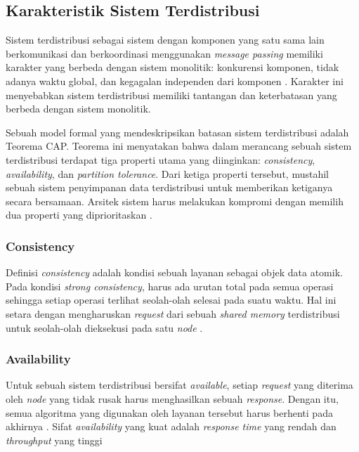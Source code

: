 \subsection{Karakteristik Sistem Terdistribusi}
\label{subsection:karakteristik-sistem-terdistribusi}

Sistem terdistribusi sebagai sistem dengan komponen yang satu sama lain berkomunikasi dan berkoordinasi menggunakan \textit{message passing} memiliki karakter yang berbeda dengan sistem monolitik: konkurensi komponen, tidak adanya waktu global, dan kegagalan independen dari komponen \parencite{coulouris2012distributed}. Karakter ini menyebabkan sistem terdistribusi memiliki tantangan dan keterbatasan yang berbeda dengan sistem monolitik.

Sebuah model formal yang mendeskripsikan batasan sistem terdistribusi adalah Teorema CAP. Teorema ini menyatakan bahwa dalam merancang sebuah sistem terdistribusi terdapat tiga properti utama yang diinginkan: \textit{consistency}, \textit{availability}, dan \textit{partition tolerance}. Dari ketiga properti tersebut, mustahil sebuah sistem penyimpanan data terdistribusi untuk memberikan ketiganya secara bersamaan. Arsitek sistem harus melakukan kompromi dengan memilih dua properti yang diprioritaskan \parencite{gilbert2002brewer}.

\subsubsection{Consistency}

Definisi \textit{consistency} adalah kondisi sebuah layanan sebagai objek data atomik. Pada kondisi \textit{strong consistency}, harus ada urutan total pada semua operasi sehingga setiap operasi terlihat seolah-olah selesai pada suatu waktu. Hal ini setara dengan mengharuskan \textit{request} dari sebuah \textit{shared memory} terdistribusi untuk seolah-olah dieksekusi pada satu \textit{node} \parencite{gilbert2002brewer}.

\subsubsection{Availability}

Untuk sebuah sistem terdistribusi bersifat \textit{available}, setiap \textit{request} yang diterima oleh \textit{node} yang tidak rusak harus menghasilkan sebuah \textit{response}. Dengan itu, semua algoritma yang digunakan oleh layanan tersebut harus berhenti pada akhirnya \parencite{gilbert2002brewer}. Sifat \textit{availability} yang kuat adalah \textit{response time} yang rendah dan \textit{throughput} yang tinggi

